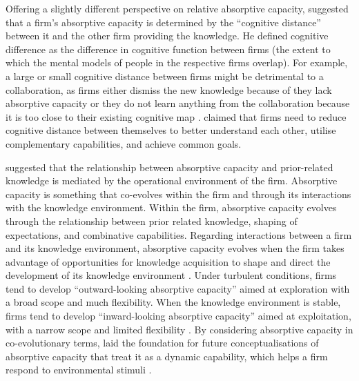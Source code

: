 Offering a slightly different perspective on relative absorptive capacity, \citet{nooteboom2000learning} suggested that a firm's absorptive capacity is determined by the \enquote{cognitive distance} between it and the other firm providing the knowledge. He defined cognitive difference as the difference in cognitive function between firms (the extent to which the mental models of people in the respective firms overlap). For example, a large or small cognitive distance between firms might be detrimental to a collaboration, as firms either dismiss the new knowledge because of they lack absorptive capacity or they do not learn anything from the collaboration because it is too close to their existing cognitive map \citep{nooteboom2007optimal,oberoi2011impact}. \citet{nooteboom2000learning} claimed that firms need to reduce cognitive distance between themselves to better understand each other, utilise complementary capabilities, and achieve common goals. \medskip

\citet{van1999coevolution} suggested that the relationship between absorptive capacity and prior-related knowledge is mediated by the operational environment of the firm. Absorptive capacity is something that co-evolves within the firm and through its interactions with the knowledge environment. Within the firm, absorptive capacity evolves through the relationship between prior related knowledge, shaping of expectations, and combinative capabilities. Regarding interactions between a firm and its knowledge environment, absorptive capacity evolves when the firm takes advantage of opportunities for knowledge acquisition to shape and direct the development of its knowledge environment \citep{van1999coevolution}. Under turbulent conditions, firms tend to develop  \enquote{outward-looking absorptive capacity} aimed at exploration with a broad scope and much flexibility. When the knowledge environment is stable, firms tend to develop \enquote{inward-looking absorptive capacity} aimed at exploitation, with a narrow scope and limited flexibility \citep{van1999coevolution,kim2016balancing}. By considering absorptive capacity in co-evolutionary terms, \citet{van1999coevolution} laid the foundation for future conceptualisations of absorptive capacity that treat it as a dynamic capability, which helps a firm respond to environmental stimuli \citep{omidvar2013revisiting}. \medskip 

